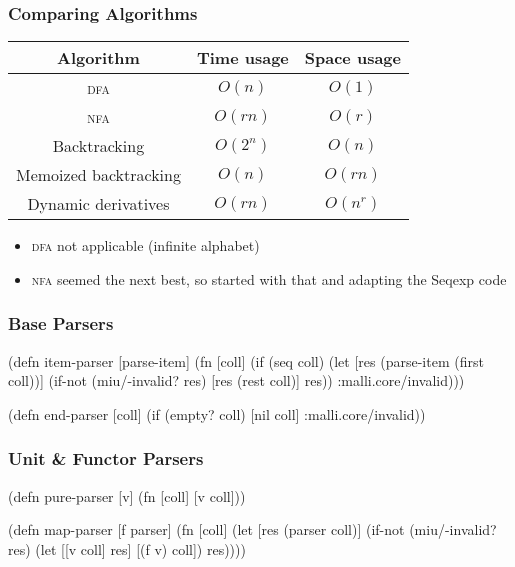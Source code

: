 \documentclass{beamer}
\begin{document}
\begin{frame}
\frametitle{Comparing Algorithms}

\begin{center}
\begin{tabular}{c | c c}
Algorithm & Time usage & Space usage \\
\hline
\textsc{dfa} & \(O(n)\) & \(O(1)\) \\
\textsc{nfa} & \(O(rn)\) & \(O(r)\) \\
Backtracking & \(O(2^n)\) & \(O(n)\) \\
Memoized backtracking & \(O(n)\) & \(O(rn)\) \\
Dynamic derivatives & \(O(rn)\) & \(O(n^r)\)
\end{tabular}
\end{center}

\begin{itemize}
\item \textsc{dfa} not applicable (infinite alphabet)
\item \textsc{nfa} seemed the next best, so started with that and adapting the Seqexp code
\end{itemize}

\end{frame}


\begin{frame}[fragile]
\frametitle{Base Parsers}

\begin{semiverbatim}
(defn item-parser [parse-item]
  (fn [coll]
    (if (seq coll)
      (let [res (parse-item (first coll))]
        (if-not (miu/-invalid? res)
          [res (rest coll)]
          res))
      :malli.core/invalid)))
\end{semiverbatim}

\begin{semiverbatim}
(defn end-parser [coll]
  (if (empty? coll)
    [nil coll]
    :malli.core/invalid))
\end{semiverbatim}

\end{frame}


\begin{frame}[fragile]
\frametitle{Unit \& Functor Parsers}

\begin{semiverbatim}
(defn pure-parser [v] (fn [coll] [v coll]))
\end{semiverbatim}

\begin{semiverbatim}
(defn map-parser [f parser]
  (fn [coll]
    (let [res (parser coll)]
      (if-not (miu/-invalid? res)
        (let [[v coll] res]
          [(f v) coll])
        res))))
\end{semiverbatim}

\end{frame}
\end{document}

